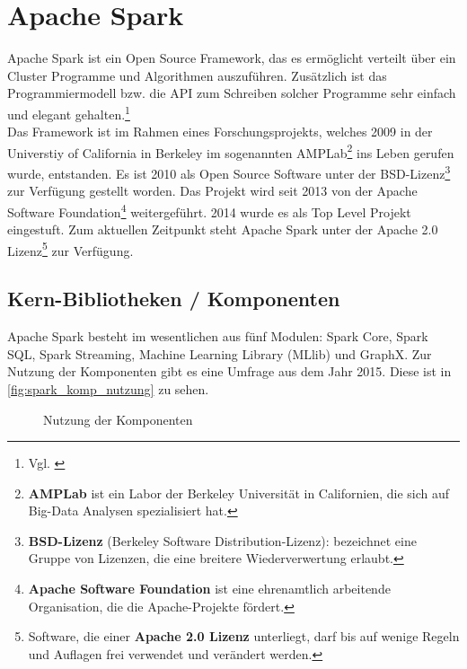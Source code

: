 \newpage
\chapter{Apache Spark} 

Apache Spark ist ein Open Source Framework, das es ermöglicht verteilt über ein Cluster Programme und Algorithmen auszuführen. Zusätzlich ist das Programmiermodell bzw. die API zum Schreiben solcher Programme sehr einfach und elegant gehalten.\footnote{Vgl. \cite{AAWS15}} \\

\noindent
Das Framework ist im Rahmen eines Forschungsprojekts, welches 2009 in der Universtiy of California in Berkeley im sogenannten AMPLab\footnote{\textbf{AMPLab} ist ein Labor der Berkeley Universität in Californien, die sich auf Big-Data Analysen spezialisiert hat. } ins Leben gerufen wurde, entstanden. Es ist 2010 als Open Source Software unter der BSD-Lizenz\footnote{\textbf{BSD-Lizenz} (Berkeley Software Distribution-Lizenz): bezeichnet eine Gruppe von Lizenzen, die eine breitere Wiederverwertung erlaubt.} zur Verfügung gestellt worden. Das Projekt wird seit 2013 von der Apache Software Foundation\footnote{\textbf{Apache Software Foundation} ist eine ehrenamtlich arbeitende Organisation, die die Apache-Projekte fördert.} weitergeführt. 2014 wurde es als Top Level Projekt eingestuft. Zum aktuellen Zeitpunkt steht Apache Spark unter der Apache 2.0 Lizenz\footnote{Software, die einer \textbf{Apache 2.0 Lizenz} unterliegt, darf bis auf wenige Regeln und Auflagen frei verwendet und verändert werden.} zur Verfügung. \\



\section{Kern-Bibliotheken / Komponenten}

Apache Spark besteht im wesentlichen aus fünf Modulen: Spark Core, Spark SQL, Spark Streaming, Machine Learning Library (MLlib) und GraphX. Zur Nutzung der Komponenten gibt es eine Umfrage aus dem Jahr 2015. Diese ist in \autoref{fig:spark_komp_nutzung} zu sehen. \\

\begin{figure}[h]
  \centering
  \caption{Nutzung der Komponenten \cite{ZXW+16}}\label{fig:spark_komp_nutzung}
\end{figure}


